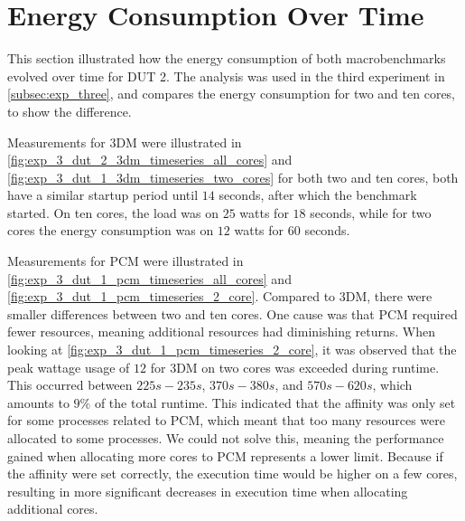 \section{Energy Consumption Over Time}\label{app:timeseries}

This section illustrated how the energy consumption of both macrobenchmarks evolved over time for DUT 2. The analysis was used in the third experiment in \cref{subsec:exp_three}, and compares the energy consumption for two and ten cores, to show the difference.



Measurements for 3DM were illustrated in \cref{fig:exp_3_dut_2_3dm_timeseries_all_cores} and \cref{fig:exp_3_dut_1_3dm_timeseries_two_cores} for both two and ten cores, both have a similar startup period until $14$ seconds, after which the benchmark started. On ten cores,  the load was on $25$ watts for $18$ seconds, while for two cores the energy consumption was on $12$ watts for $60$ seconds. 






Measurements for PCM were illustrated in \cref{fig:exp_3_dut_1_pcm_timeseries_all_cores} and \cref{fig:exp_3_dut_1_pcm_timeseries_2_core}. Compared to 3DM, there were smaller differences between two and ten cores. One cause was that PCM required fewer resources, meaning additional resources had diminishing returns. When looking at \cref{fig:exp_3_dut_1_pcm_timeseries_2_core}, it was observed that the peak wattage usage of $12$ for 3DM on two cores was exceeded during runtime. This occurred between $225s-235s$, $370s-380s$, and $570s-620s$, which amounts to $9\%$ of the total runtime. This indicated that the affinity was only set for some processes related to PCM, which meant that too many resources were allocated to some processes. We could not solve this, meaning the performance gained when allocating more cores to PCM represents a lower limit. Because if the affinity were set correctly, the execution time would be higher on a few cores, resulting in more significant decreases in execution time when allocating additional cores.

